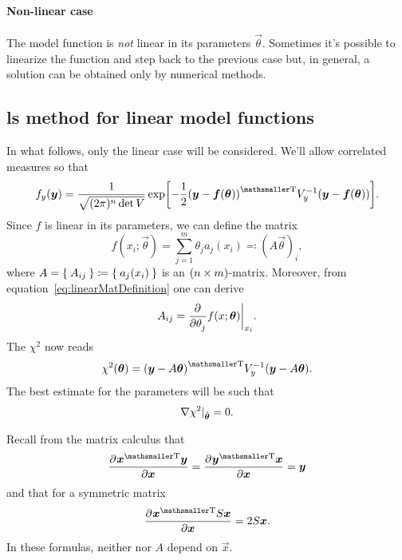 \paragraph{Non-linear case}
The model function is \emph{not} linear in its parameters $\vec{\theta}$.
Sometimes it's possible to linearize the function and step back to the previous case but, in general, a solution can be obtained only by numerical methods.

\subsection{\acs{ls} method for linear model functions}

In what follows, only the linear case will be considered.
We'll allow correlated measures so that
\begin{equation}
	f_y (\vec{y}) = \frac{1}{\sqrt{(2\pi)^n\det V}}\exp
	\squareBrackets[\bigg]{%
		-\frac{1}{2}\transpose{(\vec{y} - \vec{f}(\vec{\theta}))}V_y^{-1}(\vec{y} - \vec{f}(\vec{\theta}))
	}.
\end{equation}
Since $f$ is linear in its parameters, we can define the matrix
\begin{equation}\label{eq:linearMatDefinition}
	f(x_i;\vec{\theta}) = \sum_{j=1}^m \theta_ja_j(x_i) \eqqcolon (A\vec{\theta})_i,
\end{equation}
where $A = \Set{A_{ij}} \coloneqq \Set{a_j(x_i)}$ is an $(n\times m)$-matrix.
Moreover, from equation~\eqref{eq:linearMatDefinition} one can derive
\begin{equation}
	A_{ij} = \pderiv{}{\theta_j}f(x;\vec{\theta})\bigg\rvert_{%
	x_i}.
\end{equation}
The $\chi^2$ now reads
\begin{equation}\label{eq:ChiSquareFunctionLinear}
	\chi^2(\vec{\theta}) = \transpose{(\vec{y} - A\vec{\theta})}V_y^{-1}(\vec{y} - A\vec{\theta}).
\end{equation}
The best estimate for the parameters will be such that
\begin{equation}
	\mathop{}\!\nabla \chi^2\rvert_{\hat{\bm{{\theta}}}} = 0.
\end{equation}


Recall from the matrix calculus that
\begin{equation}
	\pderiv{\transpose{\vec{x}}\vec{y}}{\vec{x}} = 
	\pderiv{\transpose{\vec{y}}\vec{x}}{\vec{x}} = \vec{y}
\end{equation}
and that for a symmetric matrix
\begin{equation}
	\pderiv{\transpose{\vec{x}}S\vec{x}}{\vec{x}} = 2S\vec{x}.
\end{equation}
In these formulas, neither  nor $A$ depend on $\vec{x}$.


